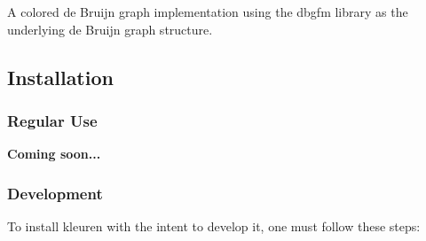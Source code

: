 A colored de Bruijn graph implementation using the {\ttfamily dbgfm} library as the underlying de Bruijn graph structure.

\subsection*{Installation}

\subsubsection*{Regular Use}

{\bfseries Coming soon...}

\subsubsection*{Development}

To install {\ttfamily kleuren} with the intent to develop it, one must follow these steps\+:


